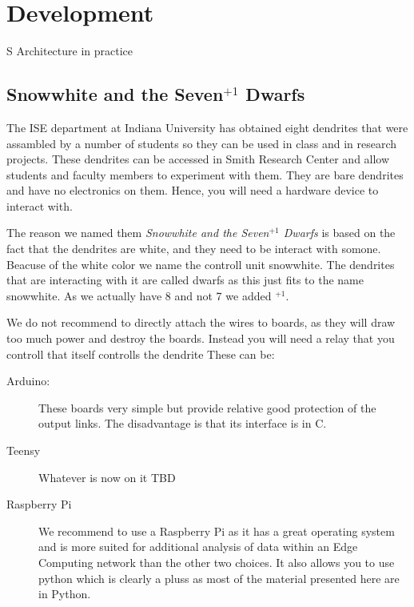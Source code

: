 \section{Development}
S Architecture in practice


\subsection{Snowwhite and the Seven$^{+1}$ Dwarfs}

The ISE department at Indiana University has obtained eight dendrites
that were assambled by a number of students so they can be used in
class and in research projects. These dendrites can be accessed in
Smith Research Center and allow students and faculty members to
experiment with them. They are bare dendrites and have no
electronics on them. Hence, you will need a hardware device to
interact with.

The reason we named them {\em Snowwhite and the Seven$^{+1}$ Dwarfs}
is based on the fact that the dendrites are white, and they need to be
interact with  somone. Beacuse of the white color we name the controll
unit snowwhite. The dendrites that are interacting with it are called
dwarfs as this just fits to the name snowwhite. As we actually have 8
and not 7 we added $^{+1}$.


We do not recommend to directly attach the
wires to boards, as they will draw too much power and destroy the
boards. Instead you will need a relay that you controll that itself
controlls the dendrite These can be:

\begin{description}

\item[Arduino:] These boards very simple but provide relative good
  protection of the output links. The disadvantage is that its
  interface is in C.

\item[Teensy] Whatever is now on it TBD

\item[Raspberry Pi] We recommend to use a Raspberry Pi as it has a
  great operating system and is more suited for additional analysis of
  data within an Edge Computing network than the other two choices. It
  also allows you to use python which is clearly a pluss as most of
  the material presented here are in Python.

\end{description}


